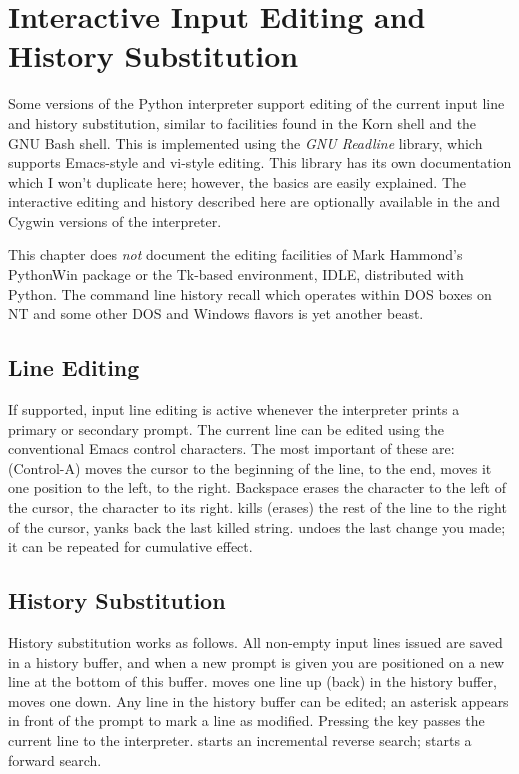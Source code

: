 \documentclass{manual}
\begin{document}
\appendix

\chapter{Interactive Input Editing and History Substitution\label{interacting}}

Some versions of the Python interpreter support editing of the current
input line and history substitution, similar to facilities found in
the Korn shell and the GNU Bash shell.  This is implemented using the
\emph{GNU Readline} library, which supports Emacs-style and vi-style
editing.  This library has its own documentation which I won't
duplicate here; however, the basics are easily explained.  The
interactive editing and history described here are optionally
available in the \UNIX{} and Cygwin versions of the interpreter.

This chapter does \emph{not} document the editing facilities of Mark
Hammond's PythonWin package or the Tk-based environment, IDLE,
distributed with Python.  The command line history recall which
operates within DOS boxes on NT and some other DOS and Windows flavors 
is yet another beast.

\section{Line Editing \label{lineEditing}}

If supported, input line editing is active whenever the interpreter
prints a primary or secondary prompt.  The current line can be edited
using the conventional Emacs control characters.  The most important
of these are:  (Control-A) moves the cursor to the beginning
of the line,  to the end,  moves it one position to
the left,  to the right.  Backspace erases the character to
the left of the cursor,  the character to its right.
 kills (erases) the rest of the line to the right of the
cursor,  yanks back the last killed string.
 undoes the last change you made; it can be repeated
for cumulative effect.

\section{History Substitution \label{history}}

History substitution works as follows.  All non-empty input lines
issued are saved in a history buffer, and when a new prompt is given
you are positioned on a new line at the bottom of this buffer.
 moves one line up (back) in the history buffer,
 moves one down.  Any line in the history buffer can be
edited; an asterisk appears in front of the prompt to mark a line as
modified.  Pressing the  key passes the current line to
the interpreter.   starts an incremental reverse search;
 starts a forward search.
\end{document}

